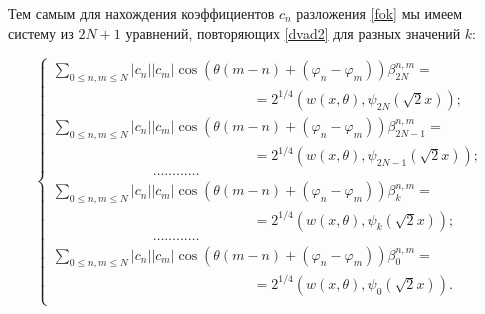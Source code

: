 Тем самым для нахождения коэффициентов $c_n$ разложения \eqref{fok} мы имеем систему из $2N+1$ уравнений, повторяющих \eqref{dvad2} для разных значений $k$:

\begin{equation}

 \label{dvad3}

          \left\{

           \begin{array}{l}

           \sum\limits_{0\leqslant n,m\leqslant N}|c_n|| c_m| \cos\left(\theta(m-n)+(\varphi_n-\varphi_m)\right)\beta_{2N}^{n,m}=

           \\

\hspace{6cm} =           

2^{1/4}\left(w(x,\theta),\psi_{2N} (\sqrt{2}x)\right);\\[3mm]

            \sum\limits_{0\leqslant n,m\leqslant N}|c_n|| c_m| \cos\left(\theta(m-n)+(\varphi_n-\varphi_m)\right)\beta_{2N-1}^{n,m}=

                       \\

\hspace{6cm} =           

2^{1/4}\left(w(x,\theta),\psi_{2N-1} (\sqrt{2}x)\right);\\

\hspace{3cm}            \dots\ldots\ldots\ldots \\[4mm]

           \sum\limits_{0\leqslant n,m\leqslant N}|c_n|| c_m| \cos\left(\theta(m-n)+(\varphi_n-\varphi_m)\right)\beta_k^{n,m}=

                                  \\

\hspace{6cm} =           

2^{1/4}\left(w(x,\theta),\psi_{k} (\sqrt{2}x)\right);\\[3mm]

\hspace{3cm}  \dots\ldots\ldots\ldots \\[4mm]         

 \sum\limits_{0\leqslant n,m\leqslant N}|c_n|| c_m| \cos\left(\theta(m-n)+(\varphi_n-\varphi_m)\right)\beta_0^{n,m}=

                        \\

\hspace{6cm} =           

2^{1/4}\left(w(x,\theta),\psi_{0} (\sqrt{2}x)\right).\\

           \end{array}

\right.

  \end{equation}





